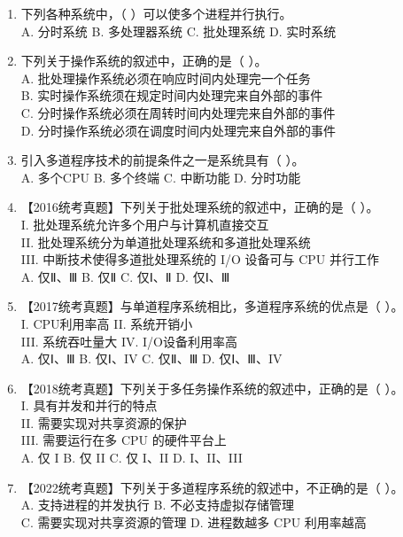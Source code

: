 \documentclass[lang=cn,newtx,10pt,scheme=chinese]{../../elegantbook}
\begin{document}
\begin{enumerate}
  \item 下列各种系统中，（ ）可以使多个进程并行执行。\\
  A. 分时系统 \quad B. 多处理器系统 \quad C. 批处理系统 \quad D. 实时系统

  \item 下列关于操作系统的叙述中，正确的是（ ）。\\
  A. 批处理操作系统必须在响应时间内处理完一个任务\\
  B. 实时操作系统须在规定时间内处理完来自外部的事件\\
  C. 分时操作系统必须在周转时间内处理完来自外部的事件\\
  D. 分时操作系统必须在调度时间内处理完来自外部的事件

  \item 引入多道程序技术的前提条件之一是系统具有（ ）。\\
  A. 多个CPU \quad B. 多个终端 \quad C. 中断功能 \quad D. 分时功能

  \item 【2016统考真题】下列关于批处理系统的叙述中，正确的是（ ）。\\
  I. 批处理系统允许多个用户与计算机直接交互\\
  II. 批处理系统分为单道批处理系统和多道批处理系统\\
  III. 中断技术使得多道批处理系统的 I/O 设备可与 CPU 并行工作\\
  A. 仅Ⅱ、Ⅲ \quad B. 仅Ⅱ \quad C. 仅Ⅰ、Ⅱ \quad D. 仅Ⅰ、Ⅲ

  \item 【2017统考真题】与单道程序系统相比，多道程序系统的优点是（ ）。\\
  I. CPU利用率高 \quad II. 系统开销小\\
  III. 系统吞吐量大 \quad IV. I/O设备利用率高\\
  A. 仅Ⅰ、Ⅲ \quad B. 仅Ⅰ、IV \quad C. 仅Ⅱ、Ⅲ \quad D. 仅Ⅰ、Ⅲ、IV
  \item 【2018统考真题】下列关于多任务操作系统的叙述中，正确的是（ ）。\\
  I. 具有并发和并行的特点\\
  II. 需要实现对共享资源的保护\\
  III. 需要运行在多 CPU 的硬件平台上\\
  A. 仅 I \quad B. 仅 II \quad C. 仅 I、II \quad D. I、II、III

  \item 【2022统考真题】下列关于多道程序系统的叙述中，不正确的是（ ）。\\
  A. 支持进程的并发执行 \quad B. 不必支持虚拟存储管理\\
  C. 需要实现对共享资源的管理 \quad D. 进程数越多 CPU 利用率越高


\end{enumerate}
\end{document}
